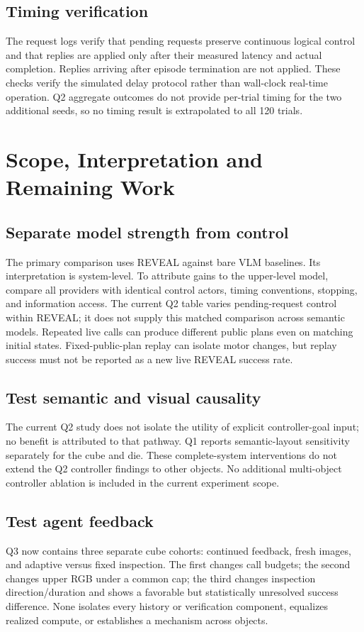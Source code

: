 \subsection{Timing verification}
The request logs verify that pending requests preserve continuous logical control and that replies are applied only after their measured latency and actual completion. Replies arriving after episode termination are not applied. These checks verify the simulated delay protocol rather than wall-clock real-time operation. Q2 aggregate outcomes do not provide per-trial timing for the two additional seeds, so no timing result is extrapolated to all 120 trials.

\section{Scope, Interpretation and Remaining Work}
\subsection{Separate model strength from control}
The primary comparison uses REVEAL against bare VLM baselines. Its interpretation is system-level. To attribute gains to the upper-level model, compare all providers with identical control actors, timing conventions, stopping, and information access. The current Q2 table varies pending-request control within REVEAL; it does not supply this matched comparison across semantic models. Repeated live calls can produce different public plans even on matching initial states. Fixed-public-plan replay can isolate motor changes, but replay success must not be reported as a new live REVEAL success rate.

\subsection{Test semantic and visual causality}
The current Q2 study does not isolate the utility of explicit controller-goal input; no benefit is attributed to that pathway. Q1 reports semantic-layout sensitivity separately for the cube and die. These complete-system interventions do not extend the Q2 controller findings to other objects. No additional multi-object controller ablation is included in the current experiment scope.

\subsection{Test agent feedback}
Q3 now contains three separate cube cohorts: continued feedback, fresh images, and adaptive versus fixed inspection. The first changes call budgets; the second changes upper RGB under a common cap; the third changes inspection direction/duration and shows a favorable but statistically unresolved success difference. None isolates every history or verification component, equalizes realized compute, or establishes a mechanism across objects.

